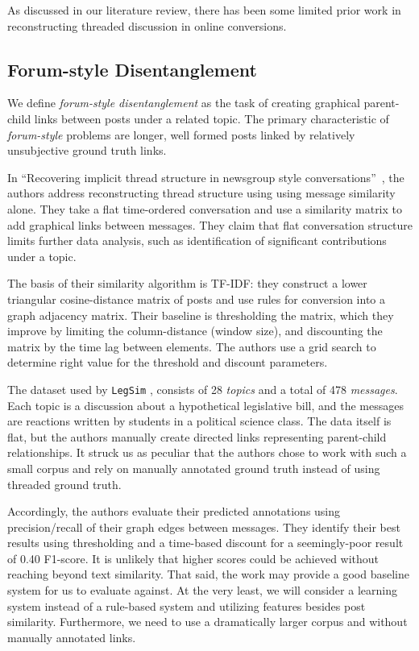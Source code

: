 \documentclass[10pt]{article}
\newcommand{\titlecite}[2]{``#1''~\cite{#2}}
\begin{document}
As discussed in our literature review, there has been some limited prior 
work in reconstructing threaded discussion in online conversions. 

\subsection{Forum-style Disentanglement}
\label{sec:threaded}
We define \textit{forum-style disentanglement} as the task of creating 
graphical parent-child links between posts under a related topic. The primary characteristic 
of \textit{forum-style} problems are longer, well formed posts 
linked by relatively unsubjective ground truth links.

In \titlecite{Recovering implicit thread structure in newsgroup style
conversations}{Wang2008a}, the authors address reconstructing thread structure
using using message similarity alone. They take a flat time-ordered
conversation and use a similarity matrix to add graphical links between
messages. They claim that flat conversation structure limits further data
analysis, such as identification of significant contributions under a topic.

The basis of their similarity algorithm is TF-IDF: they
construct a lower triangular cosine-distance matrix of posts and use rules 
for conversion into a graph adjacency matrix. Their baseline is thresholding the
matrix, which they improve by limiting the column-distance (window size), and discounting
the matrix by the time lag between elements. The authors use a grid search to
determine right value for the threshold and discount parameters.

The dataset used by \texttt{LegSim} \cite{Wang2008a}, consists of 28
\textit{topics} and a total of 478 \textit{messages}. Each topic is a
discussion about a hypothetical legislative bill, and the messages are
reactions written by students in a political science class. The data itself is
flat, but the authors manually create directed links representing parent-child
relationships. It struck us as peculiar that the authors chose to work with
such a small corpus and rely on manually annotated ground truth instead of
using threaded ground truth.

Accordingly, the authors evaluate their predicted annotations using precision/recall of
their graph edges between messages. They identify their best results using
thresholding and a time-based discount for a seemingly-poor result of 0.40 
F1-score. It is unlikely that higher scores could be achieved without reaching
beyond text similarity. That said, the work may provide a good baseline system
for us to evaluate against. At the very least, we will consider a learning
system instead of a rule-based system and utilizing features besides post
similarity.  Furthermore, we need to use a dramatically larger corpus and without manually
annotated links.
\end{document}
